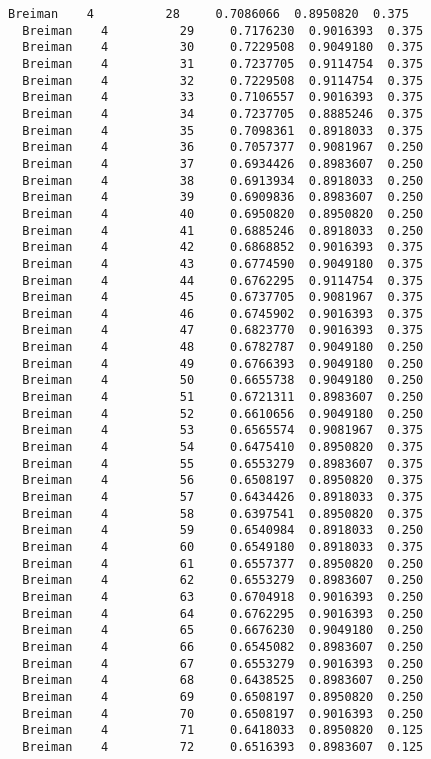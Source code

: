 \documentclass[11pt]{article}
\begin{document}
\begin{Verbatim}[commandchars=\\\{\}]
  Breiman    4          28     0.7086066  0.8950820  0.375
  Breiman    4          29     0.7176230  0.9016393  0.375
  Breiman    4          30     0.7229508  0.9049180  0.375
  Breiman    4          31     0.7237705  0.9114754  0.375
  Breiman    4          32     0.7229508  0.9114754  0.375
  Breiman    4          33     0.7106557  0.9016393  0.375
  Breiman    4          34     0.7237705  0.8885246  0.375
  Breiman    4          35     0.7098361  0.8918033  0.375
  Breiman    4          36     0.7057377  0.9081967  0.250
  Breiman    4          37     0.6934426  0.8983607  0.250
  Breiman    4          38     0.6913934  0.8918033  0.250
  Breiman    4          39     0.6909836  0.8983607  0.250
  Breiman    4          40     0.6950820  0.8950820  0.250
  Breiman    4          41     0.6885246  0.8918033  0.250
  Breiman    4          42     0.6868852  0.9016393  0.375
  Breiman    4          43     0.6774590  0.9049180  0.375
  Breiman    4          44     0.6762295  0.9114754  0.375
  Breiman    4          45     0.6737705  0.9081967  0.375
  Breiman    4          46     0.6745902  0.9016393  0.375
  Breiman    4          47     0.6823770  0.9016393  0.375
  Breiman    4          48     0.6782787  0.9049180  0.250
  Breiman    4          49     0.6766393  0.9049180  0.250
  Breiman    4          50     0.6655738  0.9049180  0.250
  Breiman    4          51     0.6721311  0.8983607  0.250
  Breiman    4          52     0.6610656  0.9049180  0.250
  Breiman    4          53     0.6565574  0.9081967  0.375
  Breiman    4          54     0.6475410  0.8950820  0.375
  Breiman    4          55     0.6553279  0.8983607  0.375
  Breiman    4          56     0.6508197  0.8950820  0.375
  Breiman    4          57     0.6434426  0.8918033  0.375
  Breiman    4          58     0.6397541  0.8950820  0.375
  Breiman    4          59     0.6540984  0.8918033  0.250
  Breiman    4          60     0.6549180  0.8918033  0.375
  Breiman    4          61     0.6557377  0.8950820  0.250
  Breiman    4          62     0.6553279  0.8983607  0.250
  Breiman    4          63     0.6704918  0.9016393  0.250
  Breiman    4          64     0.6762295  0.9016393  0.250
  Breiman    4          65     0.6676230  0.9049180  0.250
  Breiman    4          66     0.6545082  0.8983607  0.250
  Breiman    4          67     0.6553279  0.9016393  0.250
  Breiman    4          68     0.6438525  0.8983607  0.250
  Breiman    4          69     0.6508197  0.8950820  0.250
  Breiman    4          70     0.6508197  0.9016393  0.250
  Breiman    4          71     0.6418033  0.8950820  0.125
  Breiman    4          72     0.6516393  0.8983607  0.125

\end{Verbatim}
\end{document}
